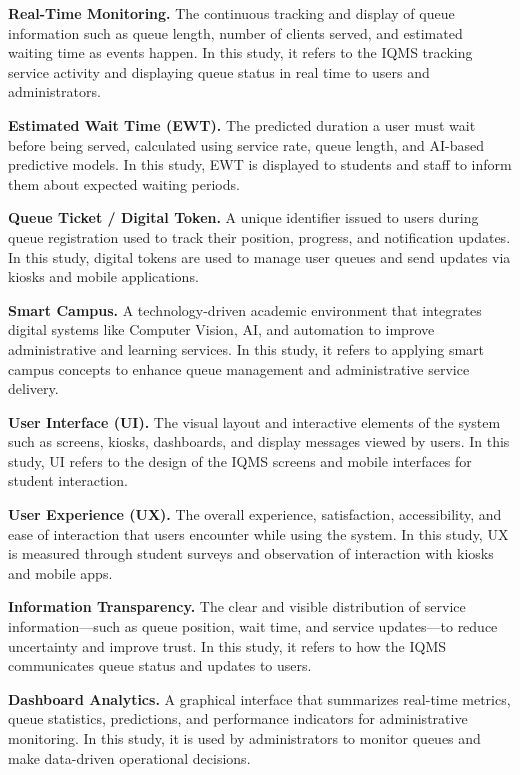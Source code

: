 \documentclass{research}
\begin{document}
\textbf {Real-Time Monitoring.} The continuous tracking and display of queue information such as queue length, number of clients served, and estimated waiting time as events happen. In this study, it refers to the IQMS tracking service activity and displaying queue status in real time to users and administrators.

\textbf {Estimated Wait Time (EWT).} The predicted duration a user must wait before being served, calculated using service rate, queue length, and AI-based predictive models. In this study, EWT is displayed to students and staff to inform them about expected waiting periods.

\textbf {Queue Ticket / Digital Token.} A unique identifier issued to users during queue registration used to track their position, progress, and notification updates. In this study, digital tokens are used to manage user queues and send updates via kiosks and mobile applications.

\textbf {Smart Campus.} A technology-driven academic environment that integrates digital systems like Computer Vision, AI, and automation to improve administrative and learning services. In this study, it refers to applying smart campus concepts to enhance queue management and administrative service delivery.

\textbf {User Interface (UI).} The visual layout and interactive elements of the system such as screens, kiosks, dashboards, and display messages viewed by users. In this study, UI refers to the design of the IQMS screens and mobile interfaces for student interaction.

\textbf {User Experience (UX).} The overall experience, satisfaction, accessibility, and ease of interaction that users encounter while using the system. In this study, UX is measured through student surveys and observation of interaction with kiosks and mobile apps.

\textbf {Information Transparency.} The clear and visible distribution of service information---such as queue position, wait time, and service updates---to reduce uncertainty and improve trust. In this study, it refers to how the IQMS communicates queue status and updates to users.

\textbf {Dashboard Analytics.} A graphical interface that summarizes real-time metrics, queue statistics, predictions, and performance indicators for administrative monitoring. In this study, it is used by administrators to monitor queues and make data-driven operational decisions.
\end{document}
